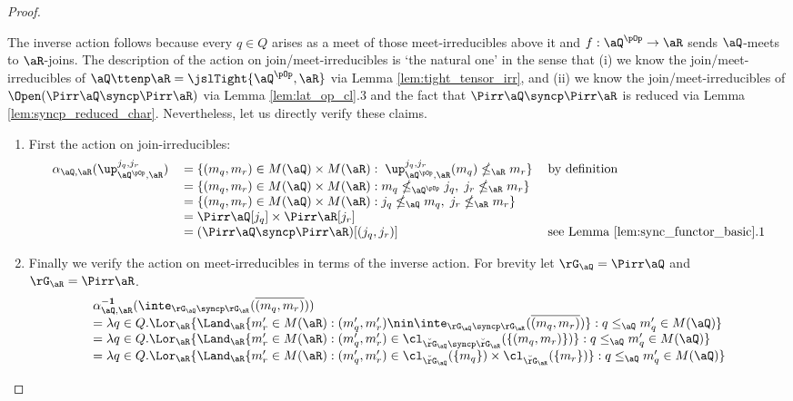 \documentclass{article}
\begin{document}
\begin{proof}
\begin{enumerate}
\bigskip
The inverse action follows because every $q \in Q$ arises as a meet of those meet-irreducibles above it and $f : \aQ^{\pOp} \to \aR$ sends $\aQ$-meets to $\aR$-joins. The description of the action on join/meet-irreducibles is `the natural one' in the sense that (i) we know the join/meet-irreducibles of $\aQ \ttenp \aR = \jslTight{\aQ^{\pOp},\aR}$ via Lemma \ref{lem:tight_tensor_irr}, and (ii) we know the join/meet-irreducibles of $\Open(\Pirr\aQ \syncp \Pirr\aR)$ via Lemma \ref{lem:lat_op_cl}.3 and the fact that $\Pirr\aQ \syncp \Pirr\aR$ is reduced via Lemma \ref{lem:syncp_reduced_char}. Nevertheless, let us directly verify these claims.
\begin{enumerate}
\item
First the action on join-irreducibles:
\[
\begin{tabular}{lll}
$\alpha_{\aQ,\aR}(\up_{\aQ^{\pOp},\aR}^{j_q,j_r})$
&
$= \{ (m_q,m_r) \in M(\aQ) \times M(\aR) : \; \up_{\aQ^{\pOp},\aR}^{j_q,j_r}(m_q) \nleq_\aR m_r \}$
& by definition
\\&
$= \{ (m_q,m_r) \in M(\aQ) \times M(\aR) : m_q \nleq_{\aQ^{\pOp}} j_q , \; j_r \nleq_\aR m_r \}$
\\&
$= \{ (m_q,m_r) \in M(\aQ) \times M(\aR) : j_q \nleq_\aQ m_q , \; j_r \nleq_\aR m_r \}$
\\&
$= \Pirr\aQ[j_q] \times \Pirr\aR[j_r]$
\\&
$= (\Pirr\aQ \syncp \Pirr\aR)[(j_q,j_r)]$
& see Lemma \ref{lem:sync_functor_basic}.1
\end{tabular}
\]
\item
Finally we verify the action on meet-irreducibles in terms of the inverse action. For brevity let $\rG_\aQ = \Pirr\aQ$ and $\rG_\aR = \Pirr\aR$.
\[
\begin{tabular}{lll}
$\alpha_{\aQ,\aR}^{\bf-1}(\inte_{\rG_\aQ \syncp \rG_\aR}(\overline{(m_q,m_r)}))$
\\
$= \lambda q \in Q. \Lor_\aR \{ \Land_\aR \{ m'_r \in M(\aR) : (m'_q,m'_r) \nin \inte_{\rG_\aQ \syncp \rG_\aR}(\overline{(m_q,m_r)}) \} : q \leq_\aQ m'_q \in M(\aQ) \}$
\\
$= \lambda q \in Q. \Lor_\aR \{ \Land_\aR \{ m'_r \in M(\aR) : (m'_q,m'_r) \in \cl_{\breve{\rG}_\aQ \syncp \breve{\rG}_\aR}(\{(m_q,m_r)\}) \} : q \leq_\aQ m'_q \in M(\aQ) \}$
\\
$= \lambda q \in Q. \Lor_\aR \{ \Land_\aR \{ m'_r \in M(\aR) : (m'_q,m'_r) \in \cl_{\breve{\rG}_\aQ}(\{m_q\}) \times \cl_{\breve{\rG}_\aR}(\{m_r\}) \} : q \leq_\aQ m'_q \in M(\aQ) \}$
\\

\end{tabular}\]
\end{enumerate}
\end{enumerate}
\end{proof}
\end{document}
